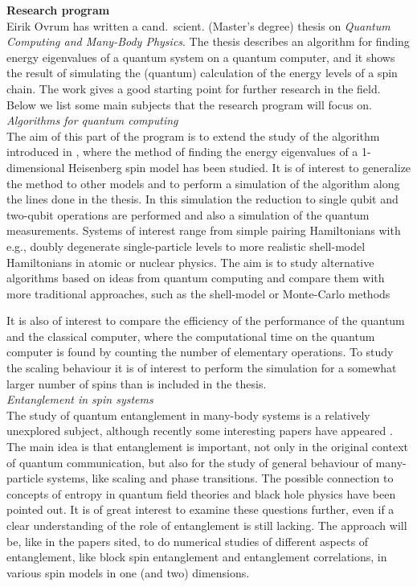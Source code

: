 \noindent
{\large{\bf Research program}}\\
Eirik Ovrum has written a cand.~scient. (Master's degree)
thesis on {\em Quantum Computing and
Many-Body  Physics}. The thesis describes an algorithm for finding energy
eigenvalues of a quantum system on a quantum computer, and it shows
the result of
simulating the (quantum) calculation of the energy levels of a spin chain. The
work gives a good starting point for further research in the field.  Below we
list some main subjects that the research program will focus on.\\

\noindent
{\em Algorithms for quantum computing}\\
The aim of this part of the program is to extend the study of the algorithm
introduced in  \cite{eirik}, where the method of finding the energy
eigenvalues of a
1-dimensional Heisenberg spin model has been studied. It is of interest to
generalize the method to other models and to perform a simulation of the
algorithm along the lines done in the thesis. In this simulation the
reduction to
single qubit and two-qubit operations are performed and also a
simulation of the
quantum measurements.
Systems of interest range from simple pairing Hamiltonians with
e.g., doubly degenerate single-particle levels to more realistic shell-model
Hamiltonians in atomic or nuclear physics. The aim is to study alternative
algorithms based on ideas from quantum computing and compare them with
more traditional approaches, such as the shell-model or Monte-Carlo
methods

It is also of interest to compare the efficiency of the
performance of the quantum and the classical computer, where the computational
time on the quantum computer is found by counting the number of elementary
operations. To study the scaling behaviour it is of interest to perform the
simulation for a somewhat larger number of spins than is included in
the thesis.\\

\noindent
{\em Entanglement in spin systems}\\
The study of quantum entanglement in many-body systems is a
relatively unexplored
subject, although recently some interesting papers have appeared
\cite{Osborne, Vidal, Latorre}. The main idea is that entanglement is
important,
not only in the original context of quantum communication, but also
for the study
of general behaviour of many-particle systems, like scaling and phase
transitions.
The possible connection to concepts of entropy in quantum field
theories and black
hole physics have been pointed out. It is of great interest to examine these
questions further, even if a clear understanding of the role of entanglement is
still lacking. The approach will be, like in the papers sited, to do numerical
studies of different aspects of entanglement, like block spin entanglement and
entanglement correlations, in various spin models in one (and two)
dimensions.\\

